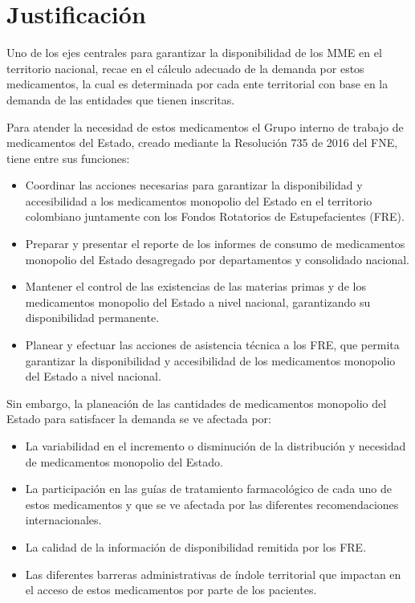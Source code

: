 \documentclass[
]{book}
\begin{document}
\hypertarget{justificaciuxf3n}{%
\chapter{Justificación}\label{justificaciuxf3n}}

Uno de los ejes centrales para garantizar la disponibilidad de los MME en el territorio nacional, recae en el cálculo adecuado de la demanda por estos medicamentos, la cual es determinada por cada ente territorial con base en la demanda de las entidades que tienen inscritas.

Para atender la necesidad de estos medicamentos el Grupo interno de trabajo de medicamentos del Estado, creado mediante la Resolución 735 de 2016 del FNE, tiene entre sus funciones:

\begin{itemize}
\item
  Coordinar las acciones necesarias para garantizar la disponibilidad y accesibilidad a los medicamentos monopolio del Estado en el territorio colombiano juntamente con los Fondos Rotatorios de Estupefacientes (FRE).
\item
  Preparar y presentar el reporte de los informes de consumo de medicamentos monopolio del Estado desagregado por departamentos y consolidado nacional.
\item
  Mantener el control de las existencias de las materias primas y de los medicamentos monopolio del Estado a nivel nacional, garantizando su disponibilidad permanente.
\item
  Planear y efectuar las acciones de asistencia técnica a los FRE, que permita garantizar la disponibilidad y accesibilidad de los medicamentos monopolio del Estado a nivel nacional.
\end{itemize}

Sin embargo, la planeación de las cantidades de medicamentos monopolio del Estado para satisfacer la demanda se ve afectada por:

\begin{itemize}
\item
  La variabilidad en el incremento o disminución de la distribución y necesidad de medicamentos monopolio del Estado.
\item
  La participación en las guías de tratamiento farmacológico de cada uno de estos medicamentos y que se ve afectada por las diferentes recomendaciones internacionales.
\item
  La calidad de la información de disponibilidad remitida por los FRE.
\item
  Las diferentes barreras administrativas de índole territorial que impactan en el acceso de estos medicamentos por parte de los pacientes.
\end{itemize}
\end{document}

